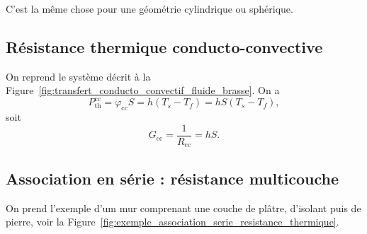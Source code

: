             C'est la même chose pour une géométrie cylindrique ou sphérique.

    \subsection{Résistance thermique conducto-convective}

        On reprend le système décrit à la Figure~\ref{fig:transfert_conducto_convectif_fluide_brasse}. On a 
        \begin{equation*}
            P_{\text{th}}^{\text{cc}}=\varphi_{\text{cc}}S=h(T_s-T_f)=hS(T_s-T_f),    
        \end{equation*}
        soit
        \begin{equation*}
            \boxed{
                G_{\text{cc}}=\frac{1}{R_{\text{cc}}}=hS.
            }
        \end{equation*}

    \subsection{Association en série : résistance \og multicouche\fg}

        On prend l'exemple d'um mur comprenant une couche de plâtre, d'isolant puis de pierre, voir la Figure~\ref{fig:exemple_association_serie_resistance_thermique}.

